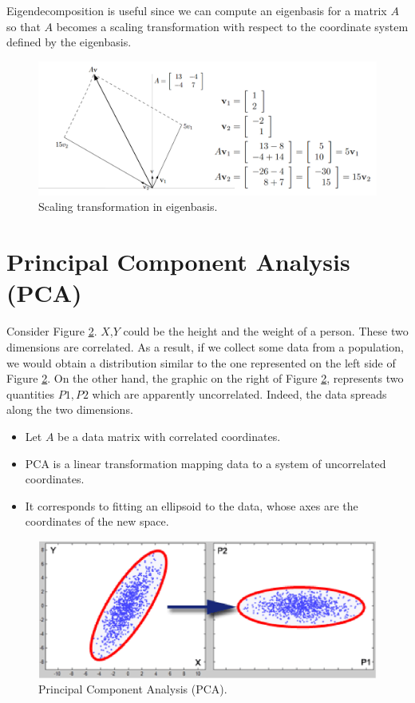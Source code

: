 Eigendecomposition is useful since we can compute an eigenbasis for a matrix $A$
so that $A$ becomes a scaling transformation with respect to the coordinate
system defined by the eigenbasis.

\begin{figure}[H]
	\centering
	\includegraphics[width=\textwidth]{
		images/04_LinearAlgebra_eigenbasisTransformation.png
	}
	\caption{Scaling transformation in eigenbasis.}
	\label{fig:eigenbasis_trans}
\end{figure}

\section{Principal Component Analysis (PCA)}
Consider Figure \ref{fig:eigen_PCA}. $X$,$Y$ could be the height and the weight
of a person. These two dimensions are correlated. As a result, if we collect some
data from a population, we would obtain a distribution similar to the one
represented on the left side of Figure \ref{fig:eigen_PCA}. On the other hand,
the graphic on the right of Figure \ref{fig:eigen_PCA}, represents two quantities
$P1, P2$ which are apparently uncorrelated. Indeed, the data spreads along the two
dimensions.

\begin{itemize}
	\item Let $A$ be a data matrix with correlated coordinates.

	\item PCA is a linear transformation mapping data to a system of uncorrelated coordinates.

	\item It corresponds to fitting an ellipsoid to the data, whose axes are the
		coordinates of the new space.
\end{itemize}

\begin{figure}[H]
	\centering
	\includegraphics[width=\textwidth]{images/04_LinearAlgebra_PCA.png}
	\caption{Principal Component Analysis (PCA).}
	\label{fig:eigen_PCA}
\end{figure}

